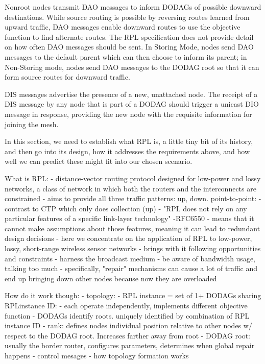 Nonroot nodes transmit DAO messages to inform DODAGs of possible downward destinations.
While source routing is possible by reversing routes learned from upward traffic, DAO messages enable downward routes to use the objective function to find alternate routes.
The RPL specification does not provide detail on how often DAO messages should be sent.
In Storing Mode, nodes send DAO messages to the default parent which can then choose to inform its parent; in Non-Storing mode, nodes send DAO messages to the DODAG root so that it can form source routes for downward traffic.

DIS messages advertise the presence of a new, unattached node.
The receipt of a DIS message by any node that is part of a DODAG should trigger a unicast DIO message in response, providing the new node with the requisite information for joining the mesh.

In this section, we need to establish what RPL is, a little tiny bit of its history, and then
go into its design, how it addresses the requirements above, and how well we can predict
these might fit into our chosen scenario.

What is RPL:
  - distance-vector routing protocol designed for low-power and lossy networks, a class of
    network in which both the routers and the interconnects are constrained
  - aims to provide all three traffic patterns: up, down. point-to-point:
    - contrast to CTP which only does collection (up)
  - "RPL does not rely on any particular features of a specific link-layer technology" -RFC6550
  - means that it cannot make assumptions about those features, meaning it can lead to
    redundant design decisions
  - here we concentrate on the application of RPL to low-power, lossy, short-range wireless
    sensor networks
  - brings with it following opportunities and constraints
    - harness the broadcast medium
    - be aware of bandwidth usage, talking too much
    - specifically, "repair" mechanisms can cause a lot of traffic and end up bringing down
      other nodes because now they are overloaded

How do it work though:
- topology:
  - RPL instance = set of 1+ DODAGs sharing RPLinstance ID:
    - each operate independently, implements different objective function
  - DODAGs identify roots. uniquely identified by combination of RPL instance ID
  - rank: defines nodes individual position relative to other nodes w/ respect to the
    DODAG root. Increases farther away from root
  - DODAG root: usually the border router, configures parameters, determines when global
    repair happens
- control mesages
- how topology formation works
\fi

